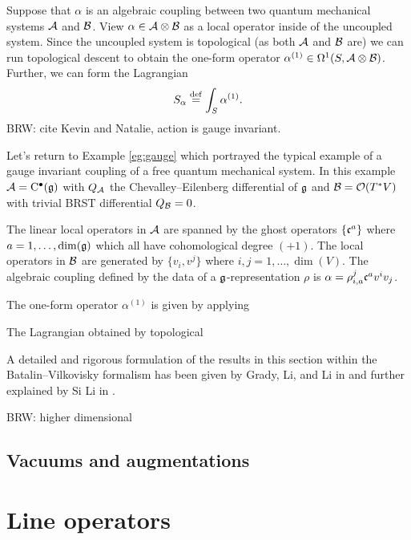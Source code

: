 \documentclass[11pt]{amsart}
\def\brian#1{{\textcolor{blue!65!red}{BRW: {#1}}}}
\begin{document}
Suppose that $\alpha$ is an algebraic coupling between two quantum mechanical systems $\mathcal A$ and $\mathcal B$. 
View $\alpha \in \mathcal A \otimes \mathcal B$ as a local operator inside of the uncoupled system. 
Since the uncoupled system is topological (as both $\mathcal A$ and $\mathcal B$ are) we can run topological descent to obtain the one-form operator $\alpha^{(1)} \in \Omega^1 (S , \mathcal A \otimes \mathcal B)$.
Further, we can form the Lagrangian 
\[
S_\alpha \overset{\rm def}{=} \int_S \alpha^{(1)} .\]
\brian{cite Kevin and Natalie, action is gauge invariant.}

\begin{eg}
\label{eg:gaugelocal}
Let's return to Example \ref{eg:gauge} which portrayed the typical example of a gauge invariant coupling of a free quantum mechanical system. 
In this example $\mathcal A = {\rm C}^\bullet(\mathfrak g)$ with $Q_{\mathcal A}$ the Chevalley--Eilenberg differential of $\mathfrak g$ and $\mathcal B = \mathcal O(T^* V)$ with trivial BRST differential $Q_{\mathcal B} = 0$. 

The linear local operators in $\mathcal A$ are spanned by the ghost operators $\{\mathfrak c^a\}$ where $a = 1,\ldots, \dim(\mathfrak g)$ which all have cohomological degree $(+1)$. 
The local operators in $\mathcal B$ are generated by $\{v_i, v^j\}$ where $i,j=1,\ldots, \dim(V)$. 
The algebraic coupling defined by the data of a $\mathfrak g$-representation $\rho$ is $\alpha = \rho_{i,a}^j \mathfrak c^a v^i v_j$. 

The one-form operator $\alpha^{(1)}$ is given by applying 

The Lagrangian obtained by topological 
\end{eg}

A detailed and rigorous formulation of the results in this section within the Batalin--Vilkovisky formalism has been given by Grady, Li, and Li in \cite{GLL} and further explained by Si Li in \cite{LiVertex}.

\brian{higher dimensional}

\subsection{Vacuums and augmentations}


\section{Line operators}
\label{sec:lines}

\end{document}
